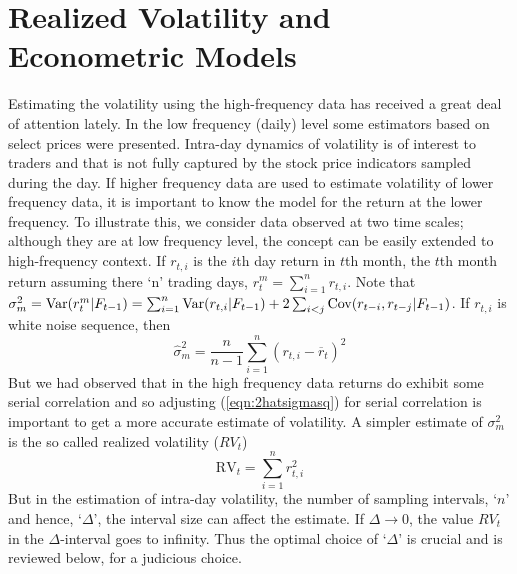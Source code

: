 \section{Realized Volatility and Econometric Models}


Estimating the volatility using the high-frequency data has received a great deal of attention lately. In the low frequency (daily) level some estimators based on select prices were presented. Intra-day dynamics of volatility is of interest to traders and that is not fully captured by the stock price indicators sampled during the day. If higher frequency data are used to estimate volatility of lower frequency data, it is important to know the model for the return at the lower frequency. To illustrate this, we consider data observed at two time scales; although they are at low frequency level, the concept can be easily extended to high-frequency context. If $r_{t,i}$ is the $i$th day return in $t$th month, the $t$th month return assuming there `n' trading days, $r_t^m = \sum_{i=1}^nr_{t,i}$. Note that $\sigma_m^2 = \operatorname{Var}(r_t^m|F_{t-1}) = \sum_{i=1}^n \operatorname{Var}(r_{t,i} | F_{t-1}) + 2 \sum_{i<j} \operatorname{Cov}(r_{t-i},r_{t-j} | F_{t-1})$. If $r_{t,i}$ is white noise sequence, then
	\begin{equation}\label{eqn:2hatsigmasq}
	\hat{\sigma}_m^2 = \frac{n}{n-1} \sum_{i=1}^n(r_{t,i} - \overline{r}_t)^2
	\end{equation}
But we had observed that in the high frequency data returns do exhibit some serial correlation and so adjusting (\ref{eqn:2hatsigmasq}) for serial correlation is important to get a more accurate estimate of volatility. A simpler estimate of $\sigma_m^2$ is the so called realized volatility ($RV_t$)
	\begin{equation}\label{eqn:2RV}
	\text{RV}_t = \sum_{i=1}^n r_{t,i}^2
	\end{equation}
But in the estimation of intra-day volatility, the number of sampling intervals, `$n$' and hence, `$\Delta$', the interval size can affect the estimate. If $\Delta \rightarrow 0$, the value $RV_t$ in the $\Delta$-interval goes to infinity. Thus the optimal choice of `$\Delta$' is crucial and is reviewed below, for a judicious choice.


